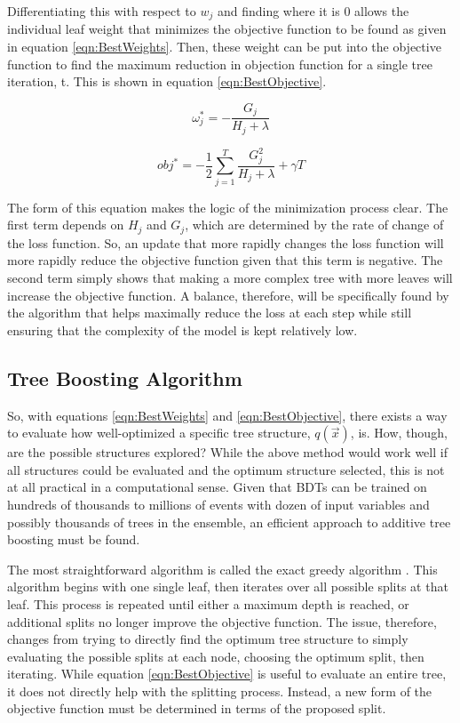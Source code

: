 \documentclass[12pt]{ucsddissertation}
\begin{document}
Differentiating this with respect to $w_j$ and finding where it is 0 allows the individual leaf weight that minimizes the objective function to be found as given in equation \ref{eqn:BestWeights}. Then, these weight can be put into the objective function to find the maximum reduction in objection function for a single tree iteration, t. This is shown in equation \ref{eqn:BestObjective}.

\begin{equation}\label{eqn:BestWeights}
	\omega^*_j = -\frac{G_j}{H_j + \lambda}
\end{equation}

\begin{equation}\label{eqn:BestObjective}
	obj^* = -\frac{1}{2}\sum_{j=1}^{T} \frac{G^2_j}{H_j + \lambda} + \gamma T
\end{equation}

The form of this equation makes the logic of the minimization process clear. The first term depends on $H_j$ and $G_j$, which are determined by the rate of change of the loss function. So, an update that more rapidly changes the loss function will more rapidly reduce the objective function given that this term is negative. The second term simply shows that making a more complex tree with more leaves will increase the objective function. A balance, therefore, will be specifically found by the algorithm that helps maximally reduce the loss at each step while still ensuring that the complexity of the model is kept relatively low.

\subsection{Tree Boosting Algorithm} \label{sec:TreeBoostingAlgorithm}

So, with equations \ref{eqn:BestWeights} and \ref{eqn:BestObjective}, there exists a way to evaluate how well-optimized a specific tree structure, $q(\vec{x})$, is. How, though, are the possible structures explored? While the above method would work well if all structures could be evaluated and the optimum structure selected, this is not at all practical in a computational sense. Given that BDTs can be trained on hundreds of thousands to millions of events with dozen of input variables and possibly thousands of trees in the ensemble, an efficient approach to additive tree boosting must be found.

The most straightforward algorithm is called the exact greedy algorithm \cite{XGBoostPaper}. This algorithm begins with one single leaf, then iterates over all possible splits at that leaf. This process is repeated until either a maximum depth is reached, or additional splits no longer improve the objective function. The issue, therefore, changes from trying to directly find the optimum tree structure to simply evaluating the possible splits at each node, choosing the optimum split, then iterating. While equation \ref{eqn:BestObjective} is useful to evaluate an entire tree, it does not directly help with the splitting process. Instead, a new form of the objective function must be determined in terms of the proposed split.
\end{document}
